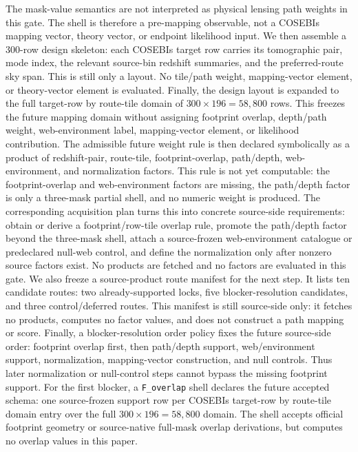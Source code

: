 \documentclass[11pt]{article}
\begin{document}
The mask-value semantics are not interpreted as physical lensing path weights in
this gate. The shell is therefore a pre-mapping observable, not a COSEBIs
mapping vector, theory vector, or endpoint likelihood input.
We then assemble a 300-row design skeleton: each COSEBIs target row carries its
tomographic pair, mode index, the relevant source-bin redshift summaries, and
the preferred-route sky span. This is still only a layout. No tile/path weight,
mapping-vector element, or theory-vector element is evaluated.
Finally, the design layout is expanded to the full target-row by route-tile
domain of \(300\times 196=58{,}800\) rows. This freezes the future mapping
domain without assigning footprint overlap, depth/path weight, web-environment
label, mapping-vector element, or likelihood contribution.
The admissible future weight rule is then declared symbolically as a product of
redshift-pair, route-tile, footprint-overlap, path/depth, web-environment, and
normalization factors. This rule is not yet computable: the footprint-overlap
and web-environment factors are missing, the path/depth factor is only a
three-mask partial shell, and no numeric weight is produced.
The corresponding acquisition plan turns this into concrete source-side
requirements: obtain or derive a footprint/row-tile overlap rule, promote the
path/depth factor beyond the three-mask shell, attach a source-frozen
web-environment catalogue or predeclared null-web control, and define the
normalization only after nonzero source factors exist. No products are fetched
and no factors are evaluated in this gate.
We also freeze a source-product route manifest for the next step. It lists ten
candidate routes: two already-supported locks, five blocker-resolution
candidates, and three control/deferred routes. This manifest is still
source-side only: it fetches no products, computes no factor values, and does
not construct a path mapping or score.
Finally, a blocker-resolution order policy fixes the future source-side order:
footprint overlap first, then path/depth support, web/environment support,
normalization, mapping-vector construction, and null controls. Thus later
normalization or null-control steps cannot bypass the missing footprint
support.
For the first blocker, a \texttt{F\_\allowbreak{}overlap} shell declares the future accepted schema:
one source-frozen support row per COSEBIs target-row by route-tile domain entry
over the full $300\times196=58{,}800$ domain. The shell accepts official
footprint geometry or source-native full-mask overlap derivations, but computes
no overlap values in this paper.
\end{document}
